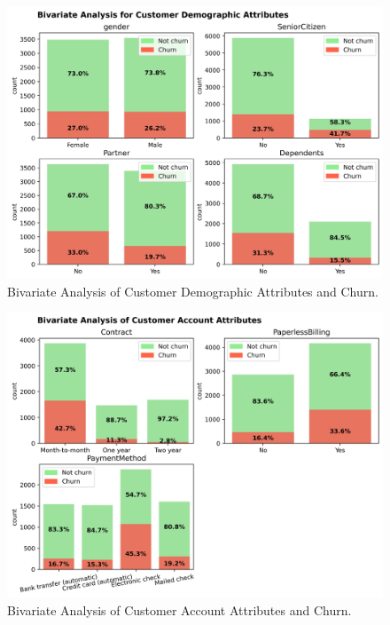 \begin{figure}[H]
	\centering
	\includegraphics[width=0.8\linewidth]{figures/customer_demo_bi}
	\caption{Bivariate Analysis of Customer Demographic Attributes and Churn.}
	\label{fig:customer_demo_bi}
\end{figure}

\begin{figure}[H]
	\centering
	\includegraphics[width=0.8\linewidth]{figures/customer_acc_bi}
	\caption{Bivariate Analysis of Customer Account Attributes and Churn.}
	\label{fig:customer_acc_bi}
\end{figure}

